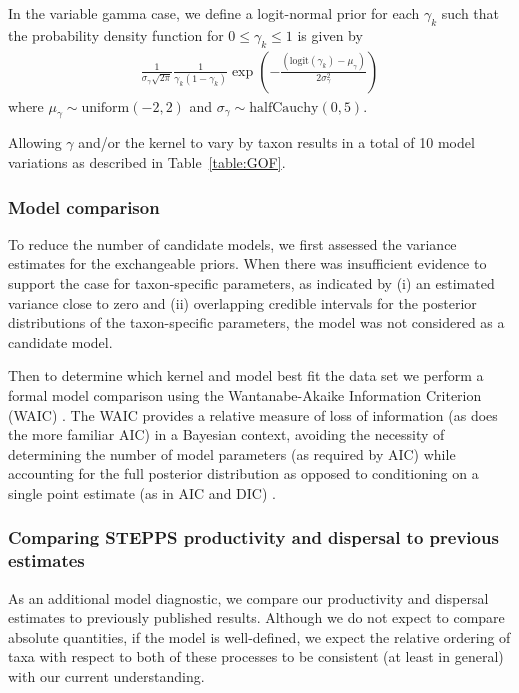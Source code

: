 \documentclass[12pt]{article}
\begin{document}
In the variable gamma case, we define a logit-normal prior for each
$\gamma_k$ such that the probability density function for $0 \leq
\gamma_k \leq 1$ is given by
\begin{align}
\frac{1}{\sigma_\gamma \sqrt{2 \pi}}\frac{1}{ \gamma_k ( 1 - \gamma_k )}\exp \left(- \frac{(\text{logit}(\gamma_k) - \mu_{\gamma})}{2 \sigma_{\gamma}^2} \right)
\end{align} 
where $\mu_{\gamma} \sim \text{uniform}(-2, 2)$ and $\sigma_{\gamma}
\sim \text{halfCauchy}(0,5)$.

Allowing $\gamma$ and/or the kernel to vary by taxon results in a
total of 10 model variations as described in Table~\ref{table:GOF}.

\subsubsection{Model comparison}

To reduce the number of candidate models, we first assessed the
variance estimates for the exchangeable priors. When there was
insufficient evidence to support the case for taxon-specific
parameters, as indicated by (i) an estimated variance close to zero
and (ii) overlapping credible intervals for the posterior
distributions of the taxon-specific parameters, the model was not
considered as a candidate model.

Then to determine which kernel and model best fit the data set we
perform a formal model comparison using the Wantanabe-Akaike
Information Criterion (WAIC) \citep{watanabe2010asymptotic}. The WAIC
provides a relative measure of loss of information (as does the more
familiar AIC) in a Bayesian context, avoiding the necessity of
determining the number of model parameters (as required by AIC) while
accounting for the full posterior distribution as opposed to
conditioning on a single point estimate (as in AIC and DIC)
\citep{gelman2014understanding}.

\subsubsection{Comparing STEPPS productivity and dispersal to
  previous estimates}

As an additional model diagnostic, we compare our productivity and
dispersal estimates to previously published results. Although we do
not expect to compare absolute quantities, if the model is
well-defined, we expect the relative ordering of taxa with respect to
both of these processes to be consistent (at least in general) with
our current understanding.
\end{document}
